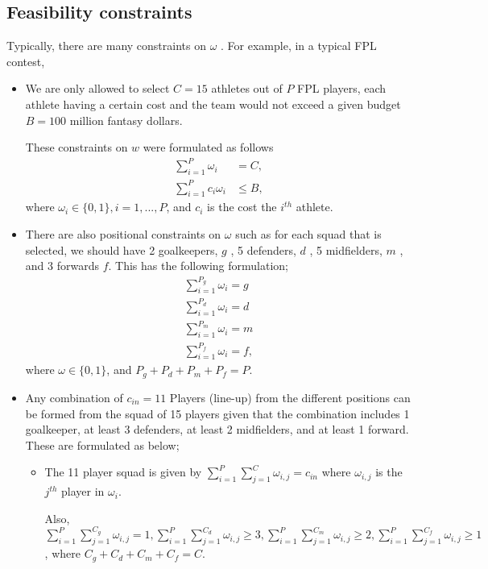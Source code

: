 \documentclass[12pt,oneside,a4paper]{book}
\theoremstyle{definition}
\theoremstyle{remark}
\begin{document}
				\subsection{Feasibility constraints} \label{sec:feasibility}
					Typically, there are many constraints on $\omega$ . For example, in a typical FPL contest,
					\begin{itemize}
						\item We are only allowed to select $C = 15$ athletes out of $P$ FPL players, each athlete having a certain cost and the team would not exceed a given budget $B=100$ million fantasy dollars.

						These constraints on $w$ were formulated as follows
						\[
						\begin{aligned}
							\sum_{i=1}^{P}\omega_i &=C,\\
							\sum_{i=1}^{P}c_i\omega_{i} &\le B,
						\end{aligned}
						\]
						where $\omega_{i} \in \{0,1\}, i = 1, ..., P$, and $c_i$ is the cost the $i^{th}$ athlete.
						\item There are also positional constraints on $\omega$ such as for each squad that is selected, we should have 2 goalkeepers, $g$ , 5 defenders, $d$ , 5 midfielders, $m$ , and 3 forwards $f$. This has the following formulation;
						\[
						\begin{aligned}
							\sum_{i=1}^{P_g}\omega_{i} =g\\
							\sum_{i=1}^{P_d}\omega_{i} =d\\
							\sum_{i=1}^{P_m}\omega_{i} =m\\
							\sum_{i=1}^{P_f}\omega_{i} =f,
						\end{aligned}
						\]
						where $\omega \in \{0,1\}$, and $P_g+P_d+P_m+P_f=P$.
						\item Any combination of $c_{in}=11$ Players (line-up) from the different positions can be formed from the squad of 15 players given that the combination includes 1 goalkeeper, at least 3 defenders, at least 2 midfielders, and at least 1 forward. These are formulated as below;
						\begin{itemize}
							\item The 11 player squad is given by $\sum_{i=1}^{P}\sum_{j=1}^{C}\omega_{i,j} = c_{in}$ where $\omega_{i,j}$ is the $j^{th}$ player in $\omega_{i}$.

							Also, $\sum_{i=1}^{P}\sum_{j=1}^{C_g}\omega_{i,j} = 1, \sum_{i=1}^{P}\sum_{j=1}^{C_d}\omega_{i,j} \ge 3, \sum_{i=1}^{P}\sum_{j=1}^{C_m}\omega_{i,j} \ge 2, \sum_{i=1}^{P}\sum_{j=1}^{C_f}\omega_{i,j} \ge 1$, where $C_g+C_d+C_m+C_f = C$.
						\end{itemize}

					\end{itemize}
\end{document}

